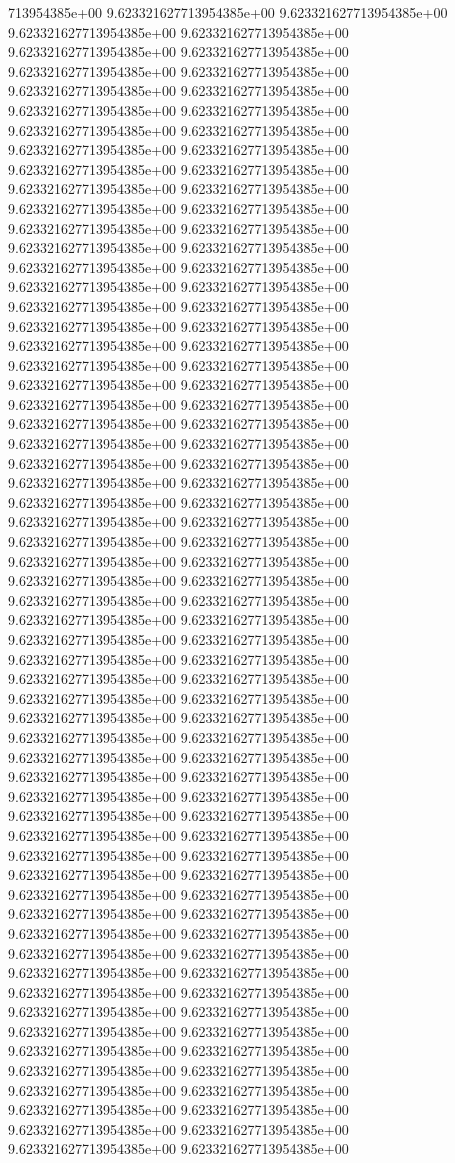 713954385e+00	9.623321627713954385e+00	9.623321627713954385e+00	9.623321627713954385e+00	9.623321627713954385e+00	9.623321627713954385e+00	9.623321627713954385e+00	9.623321627713954385e+00	9.623321627713954385e+00	9.623321627713954385e+00	9.623321627713954385e+00	9.623321627713954385e+00	9.623321627713954385e+00	9.623321627713954385e+00	9.623321627713954385e+00	9.623321627713954385e+00	9.623321627713954385e+00	9.623321627713954385e+00	9.623321627713954385e+00	9.623321627713954385e+00	9.623321627713954385e+00	9.623321627713954385e+00	9.623321627713954385e+00	9.623321627713954385e+00	9.623321627713954385e+00	9.623321627713954385e+00	9.623321627713954385e+00	9.623321627713954385e+00	9.623321627713954385e+00	9.623321627713954385e+00	9.623321627713954385e+00	9.623321627713954385e+00	9.623321627713954385e+00	9.623321627713954385e+00	9.623321627713954385e+00	9.623321627713954385e+00	9.623321627713954385e+00	9.623321627713954385e+00	9.623321627713954385e+00	9.623321627713954385e+00	9.623321627713954385e+00	9.623321627713954385e+00	9.623321627713954385e+00	9.623321627713954385e+00	9.623321627713954385e+00	9.623321627713954385e+00	9.623321627713954385e+00	9.623321627713954385e+00	9.623321627713954385e+00	9.623321627713954385e+00	9.623321627713954385e+00	9.623321627713954385e+00	9.623321627713954385e+00	9.623321627713954385e+00	9.623321627713954385e+00	9.623321627713954385e+00	9.623321627713954385e+00	9.623321627713954385e+00	9.623321627713954385e+00	9.623321627713954385e+00	9.623321627713954385e+00	9.623321627713954385e+00	9.623321627713954385e+00	9.623321627713954385e+00	9.623321627713954385e+00	9.623321627713954385e+00	9.623321627713954385e+00	9.623321627713954385e+00	9.623321627713954385e+00	9.623321627713954385e+00	9.623321627713954385e+00	9.623321627713954385e+00	9.623321627713954385e+00	9.623321627713954385e+00	9.623321627713954385e+00	9.623321627713954385e+00	9.623321627713954385e+00	9.623321627713954385e+00	9.623321627713954385e+00	9.623321627713954385e+00	9.623321627713954385e+00	9.623321627713954385e+00	9.623321627713954385e+00	9.623321627713954385e+00	9.623321627713954385e+00	9.623321627713954385e+00	9.623321627713954385e+00	9.623321627713954385e+00	9.623321627713954385e+00	9.623321627713954385e+00	9.623321627713954385e+00	9.623321627713954385e+00	9.623321627713954385e+00	9.623321627713954385e+00	9.623321627713954385e+00	9.623321627713954385e+00	9.623321627713954385e+00	9.623321627713954385e+00	9.623321627713954385e+00	9.623321627713954385e+00	9.623321627713954385e+00	9.623321627713954385e+00	9.623321627713954385e+00	9.623321627713954385e+00	9.623321627713954385e+00	9.623321627713954385e+00	9.623321627713954385e+00	9.623321627713954385e+00	9.623321627713954385e+00	9.623321627713954385e+00	9.623321627713954385e+00	9.623321627713954385e+00	9.623321627713954385e+00	9.623321627713954385e+00	9.623321627713954385e+00	9.623321627713954385e+00	9.623321627713954385e+00	9.623321627713954385e+00	9.623321627713954385e+00
